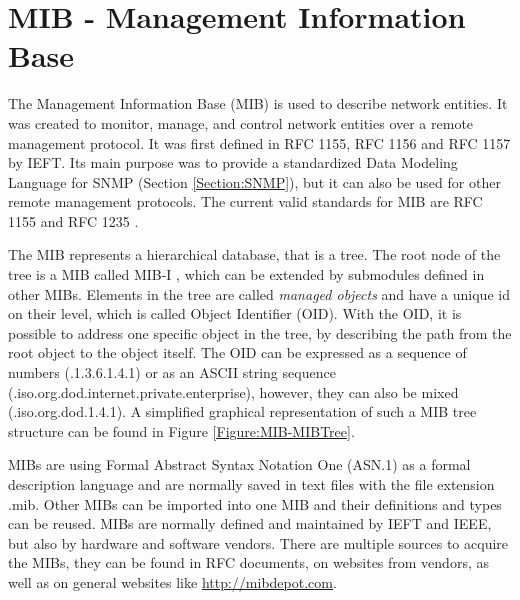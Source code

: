 \section{MIB - Management Information Base}
\label{Section:MIB}

The Management Information Base (MIB) is used to describe network entities. It was created to monitor, manage, and control network entities over a remote management protocol. It was first defined in RFC 1155\cite{RFC:RFC1155:1990}, RFC 1156\cite{RFC:RFC1156:1990} and RFC 1157\cite{RFC:RFC1157:1990} by IEFT. Its main purpose was to provide a standardized Data Modeling Language for SNMP (Section \ref{Section:SNMP}), but it can also be used for other remote management protocols. The current valid standards for MIB are RFC 1155\cite{RFC:RFC1155:1990} and RFC 1235 \cite{RFC:RFC1213:1991}.

The MIB represents a hierarchical database, that is a tree. The root node of the tree is a MIB called MIB-I \cite{RFC:RFC1155:1990}, which can be extended by submodules defined in other MIBs. Elements in the tree are called \textit{managed objects} and have a unique id on their level, which is called Object Identifier (OID). With the OID, it is possible to address one specific object in the tree, by describing the path from the root object to the object itself. The OID can be expressed as a sequence of numbers (.1.3.6.1.4.1) or as an ASCII string sequence (.iso.org.dod.internet.private.enterprise), however, they can also be mixed (.iso.org.dod.1.4.1). A simplified graphical representation of such a MIB tree structure can be found in Figure \ref{Figure:MIB-MIBTree}.

MIBs are using Formal Abstract Syntax Notation One (ASN.1)\cite{ISO:ISO8824-1:2015} as a formal description language and are normally saved in text files with the file extension .mib. Other MIBs can be imported into one MIB and their definitions and types can be reused. MIBs are normally defined and maintained by IEFT and IEEE, but also by hardware and software vendors. There are multiple sources to acquire the MIBs, they can be found in RFC documents, on websites from vendors, as well as on general websites like \url{http://mibdepot.com}.


